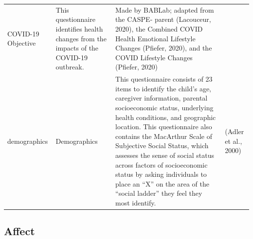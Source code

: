 \documentclass[]{book}
\begin{document}
\begin{longtable}[]{@{}llll@{}}
\begin{minipage}[t]{0.21\columnwidth}
COVID-19 Objective\strut
\end{minipage} & \begin{minipage}[t]{0.31\columnwidth}\raggedright
This questionnaire identifies health changes from the impacts of the COVID-19 outbreak.\strut
\end{minipage} & \begin{minipage}[t]{0.23\columnwidth}\raggedright
Made by BABLab; adapted from the CASPE- parent (Lacouceur, 2020), the Combined COVID Health Emotional Lifestyle Changes (Pfiefer, 2020), and the COVID Lifestyle Changes (Pfiefer, 2020)\strut
\end{minipage}\tabularnewline
\begin{minipage}[t]{0.13\columnwidth}\raggedright
demographics\strut
\end{minipage} & \begin{minipage}[t]{0.21\columnwidth}\raggedright
Demographics\strut
\end{minipage} & \begin{minipage}[t]{0.31\columnwidth}\raggedright
This questionnaire consists of 23 items to identify the child's age, caregiver information, parental socioeconomic status, underlying health conditions, and geographic location. This questionnaire also contains the MacArthur Scale of Subjective Social Status, which assesses the sense of social status across factors of socioeconomic status by asking individuals to place an ``X'' on the area of the ``social ladder'' they feel they most identify.\strut
\end{minipage} & \begin{minipage}[t]{0.23\columnwidth}\raggedright
(Adler et al., 2000)\strut
\end{minipage}\tabularnewline
\bottomrule
\end{longtable}

\hypertarget{affect}{%
\subsection{Affect}\label{affect}}
\end{document}
